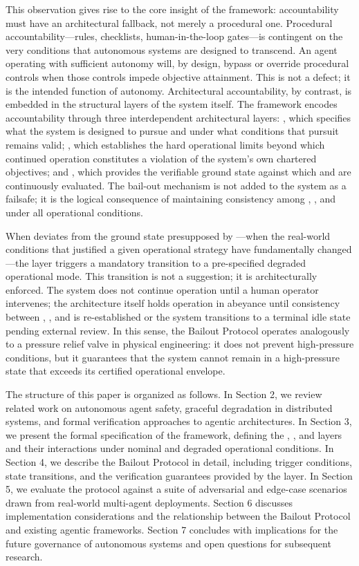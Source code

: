 This observation gives rise to the core insight of the \bxthree framework: accountability must have an architectural fallback, not merely a procedural one. Procedural accountability—rules, checklists, human-in-the-loop gates—is contingent on the very conditions that autonomous systems are designed to transcend. An agent operating with sufficient autonomy will, by design, bypass or override procedural controls when those controls impede objective attainment. This is not a defect; it is the intended function of autonomy. Architectural accountability, by contrast, is embedded in the structural layers of the system itself. The \bxthree framework encodes accountability through three interdependent architectural layers: \purpose, which specifies what the system is designed to pursue and under what conditions that pursuit remains valid; \bounds, which establishes the hard operational limits beyond which continued operation constitutes a violation of the system's own chartered objectives; and \fact, which provides the verifiable ground state against which \purpose and \bounds are continuously evaluated. The bail-out mechanism is not added to the system as a failsafe; it is the logical consequence of maintaining consistency among \purpose, \bounds, and \fact under all operational conditions.

When \fact deviates from the ground state presupposed by \purpose—when the real-world conditions that justified a given operational strategy have fundamentally changed—the \bounds layer triggers a mandatory transition to a pre-specified degraded operational mode. This transition is not a suggestion; it is architecturally enforced. The system does not continue operation until a human operator intervenes; the architecture itself holds operation in abeyance until consistency between \purpose, \bounds, and \fact is re-established or the system transitions to a terminal idle state pending external review. In this sense, the \bxthree Bailout Protocol operates analogously to a pressure relief valve in physical engineering: it does not prevent high-pressure conditions, but it guarantees that the system cannot remain in a high-pressure state that exceeds its certified operational envelope.

The structure of this paper is organized as follows. In Section 2, we review related work on autonomous agent safety, graceful degradation in distributed systems, and formal verification approaches to agentic architectures. In Section 3, we present the formal specification of the \bxthree framework, defining the \purpose, \bounds, and \fact layers and their interactions under nominal and degraded operational conditions. In Section 4, we describe the Bailout Protocol in detail, including trigger conditions, state transitions, and the verification guarantees provided by the \fact layer. In Section 5, we evaluate the protocol against a suite of adversarial and edge-case scenarios drawn from real-world multi-agent deployments. Section 6 discusses implementation considerations and the relationship between the Bailout Protocol and existing agentic frameworks. Section 7 concludes with implications for the future governance of autonomous systems and open questions for subsequent research.